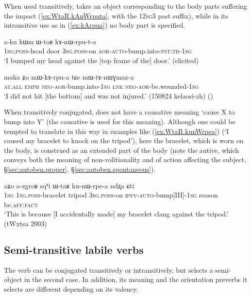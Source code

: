 When used transitively,  takes an object corresponding to the body parts suffering the impact (\ref{ex:WtaR.kAnWrputa}, with the 12\textsc{sg}\fl{}3 past  suffix), while in its intransitive use as in (\ref{ex:kArpua}) no body part is specified.

 \begin{exe}
\ex \label{ex:WtaR.kAnWrputa}
\gll  a-ku kɯm ɯ-taʁ kɤ-nɯ-rpu-t-a \\
\textsc{1sg};\textsc{poss}-head door \textsc{3sg}.\textsc{poss}-on \textsc{aor}-\textsc{auto}-bump.into-\textsc{pst}:\textsc{tr}-\textsc{1sg} \\
\glt  `I bumped my head against the [top frame of the] door.' (elicited)
\end{exe}

 \begin{exe}
\ex \label{ex:kArpua}
\gll maka ʑo mɯ-kɤ-rpu-a tɕe mɯ-tɤ-nɯɣmaz-a \\
\textsc{at}.\textsc{all} \textsc{emph} \textsc{neg}-\textsc{aor}-bump.into-\textsc{1sg} \textsc{lnk} \textsc{neg}-\textsc{aor}-be.wounded-\textsc{1sg} \\
\glt  `I did not hit [the bottom] and was not injured.' (150824 kelaosi-zh)
()
\end{exe}

When transitively conjugated,  does not have a causative meaning `cause X to bump into Y' (the causative  is used for this meaning). Although one could be tempted to translate  in this way in examples like (\ref{ex:WtaR.kunWrpea}) (`I caused my bracelet to knock on the tripod'), here the bracelet, which is worn on the body, is construed as an extended part of the body (note the autive, which conveys both the meaning of non-volitionality and of action affecting the subject, §\ref{sec:autoben.proper}, §\ref{sec:autoben.spontaneous}).

 \begin{exe}
\ex \label{ex:WtaR.kunWrpea}
\gll   aʑo a-zgroʁ sqʰi ɯ-taʁ ku-nɯ-rpe-a ndʐa ɕti \\
\textsc{1sg} \textsc{1sg}.\textsc{poss}-bracelet tripod \textsc{3sg}.\textsc{poss}-on \textsc{ipfv}-\textsc{auto}-bump[III]-\textsc{1sg} reason be.\textsc{aff}:\textsc{fact} \\
\glt `This is because [I accidentally made] my bracelet clang against the tripod.' (tWxtsa 2003)
\end{exe}

\subsection{Semi-transitive labile verbs}\label{sec:semi.tr.labile}
The verb  can be conjugated transitively or intransitively, but selects a semi-object in the second case. In addition, its meaning and the orientation preverbs it selects are different depending on its valency.


